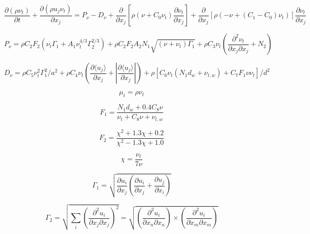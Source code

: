 

\begin{equation}
\frac{\partial (\rho \nu_t)}{\partial t} + \frac{\partial (\rho u_j \nu_t)}{\partial x_j}
= P_{\nu} - D_{\nu} + \frac{\partial}{\partial x_j}
\left[\rho \left(\nu + C_0 \nu_t \right)\frac{\partial \nu_t}{\partial x_j}\right]
+ \frac{\partial}{\partial x_j}
\left[\rho \left(-\nu + (C_1 - C_0)\nu_t \right)\right] \frac{\partial \nu_t}{\partial x_j}
\end{equation}

\begin{equation}
P_{\nu} = \rho C_2 F_2 \left( \nu_t \Gamma_1 + A_1 \nu_t^{4/3} \Gamma_2^{2/3} \right) +
\rho C_2 F_2 A_2 N_1 \sqrt{(\nu + \nu_t)\Gamma_1} +
\rho C_3 \nu_t \left( \frac{\partial^2 \nu_t}{\partial x_j \partial x_j} + N_2 \right)
\end{equation}

\begin{equation}
D_{\nu} = \rho C_5 \nu_t^2 \Gamma_1^2 / a^2 +
\rho C_4 \nu_t \left( \frac{\partial \langle u_j \rangle}{\partial x_j} + 
\left| \frac{\partial \langle u_j \rangle}{\partial x_j} \right| \right) +
\rho \left[ C_6 \nu_t ( N_1 d_w + \nu_{t,w}) + C_7 F_1 \nu \nu_t \right] / d^2
\end{equation}

\begin{equation}
\mu_t = \rho \nu_t
\end{equation}

\begin{equation}
F_1 = \frac{N_1 d_w + 0.4 C_8 \nu}{\nu_t + C_8 \nu + \nu_{t,w}}
\end{equation}

\begin{equation}
F_2 = \frac{\chi^2 + 1.3 \chi + 0.2}{\chi^2 - 1.3 \chi + 1.0}
\end{equation}

\begin{equation}
\chi = \frac{\nu_t}{7 \nu}
\end{equation}

\begin{equation}
\Gamma_1 = \sqrt{ \frac{\partial u_i}{\partial x_j} \left( \frac{\partial u_i}{\partial x_j} + 
\frac{\partial u_j}{\partial x_i} \right) }
\end{equation}

\begin{equation}
\Gamma_2 = \sqrt{ \sum_i \left( \frac{\partial^2 u_i}{\partial x_j \partial x_j} \right)^2 } =
\sqrt{ \left( \frac{\partial^2 u_i}{\partial x_n \partial x_n} \right) \times
       \left( \frac{\partial^2 u_i}{\partial x_m \partial x_m} \right) }
\end{equation}

